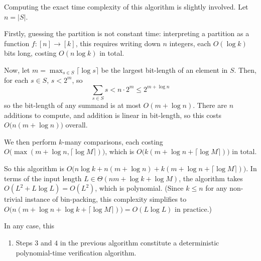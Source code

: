 \documentclass{article}
\theoremstyle{definition}
\theoremstyle{definition}
\theoremstyle{remark}
\begin{document}
Computing the exact time complexity of this algorithm is slightly involved. Let $n=|S|$.

Firstly, guessing the partition is not constant time: interpreting a partition as a function $f:[n]\rightarrow[k]$, this requires writing down $n$ integers, each $O(\log{k})$ bits long, costing $O(n\log{k})$ in total.

Now, let $m=\max_{s\in S}\lceil\log{s}\rceil$ be the largest bit-length of an element in $S$. Then, for each $s\in S$, $s<2^m$, so
\begin{equation*}
    \sum_{s\in S}s<n\cdot2^m\leq2^{m+\log{n}}
\end{equation*}
so the bit-length of any summand is at most $O(m+\log n)$. There are $n$ additions to compute, and addition is linear in bit-length, so this costs $O\bigl(n(m+\log{n})\bigr)$ overall.

We then perform $k$-many comparisons, each costing $O\bigl(\max(m+\log{n},\lceil\log{M}\rceil)\bigr)$, which is $O\bigl(k(m+\log{n}+\lceil\log{M}\rceil)\bigr)$ in total.

So this algorithm is $O\bigl(n\log{k}+n(m+\log{n})+k(m+\log{n}+\lceil\log{M}\rceil)\bigr)$. In terms of the input length $L\in\Theta(nm+\log{k}+\log{M})$, the algorithm takes $O(L^2+L\log{L})=O(L^2)$, which is polynomial. (Since $k\leq n$ for any non-trivial instance of bin-packing, this complexity simplifies to $O\bigl(n(m+\log{n}+\log{k}+\lceil\log{M}\rceil)\bigr)=O(L\log{L})$ in practice.)


In any case, this

\begin{enumerate}
    \item[$(iii)$] Steps $3$ and $4$ in the previous algorithm constitute a deterministic polynomial-time verification algorithm.
\end{enumerate}
\end{document}
